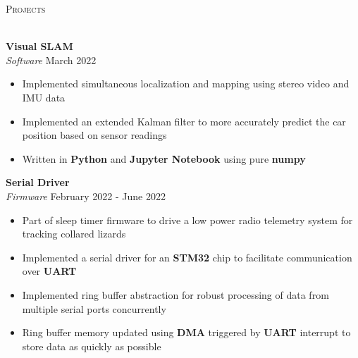 \documentclass[a4paper]{article}
\newcommand{\lineunder} {
    \vspace*{-8pt} \\
    \hspace*{-18pt} \hrulefill \\
}
\newcommand{\header} [1] {
    {\hspace*{-18pt}\vspace*{6pt} \textsc{#1}}
    \vspace*{-6pt} \lineunder
}
\newenvironment{entry}[4][]{
  \textbf{#2} \hfill #1 \\
  \textit{#3} \hfill #4 \\
  \vspace{-2mm}
  \begin{itemize} \itemsep 0em
  }
  {
  \end{itemize}
}
\begin{document}
\header{Projects}
\vspace{1mm}

\begin{entry}{Visual SLAM}{Software}{March 2022}
\item Implemented simultaneous localization and mapping using stereo video and IMU data
\item Implemented an extended Kalman filter to more accurately predict the car position based on sensor readings
\item Written in \textbf{Python} and \textbf{Jupyter Notebook} using pure \textbf{numpy}
\end{entry}

\begin{entry}{Serial Driver}{Firmware}{February 2022 - June 2022}
\item Part of sleep timer firmware to drive a low power radio telemetry system
  for tracking collared lizards
\item Implemented a serial driver for an \textbf{STM32} chip to facilitate
  communication over \textbf{UART}
\item Implemented ring buffer abstraction for robust processing of data from multiple serial ports concurrently
\item Ring buffer memory updated using \textbf{DMA} triggered by \textbf{UART}
  interrupt to store data as quickly as possible
\end{entry}

\begin{comment}
\begin{entry}{Carbon Price Tag}{Full Stack Web Development}{February 2020}
\item Chrome extension that displays extra carbon cost of items from Amazon
  Whole Foods
\item Implemented shipping route calculation with Google Maps API and used
  \textbf{Flask} backend
\item Winner of the Sustainability vertical at HackSC 2020
\end{entry}
\end{comment}

\begin{comment}
\begin{entry}{ACM Meme Gen}{Full Stack Web Development}{June 2019 - December 2019}
\item Created a meme generator as a supplement for students to learn MongoDB, Express, React, and Node.js
\item Implemented \textbf{React} components and state management, called the
  Imgflip API for templates
\item \textbf{MongoDB} back-end used to store user-created memes for a central gallery
\end{entry}
\end{comment}
\end{document}
